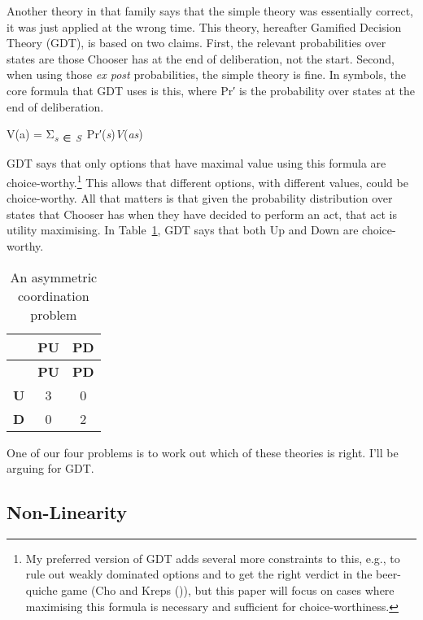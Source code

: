 \documentclass[
  10pt,
  letterpaper,
  DIV=11,
  numbers=noendperiod,
  twoside]{scrartcl}
\providecommand{\tightlist}{%
  \setlength{\itemsep}{0pt}\setlength{\parskip}{0pt}}\usepackage{longtable,booktabs,array}
\begin{document}
Another theory in that family says that the simple theory was
essentially correct, it was just applied at the wrong time. This theory,
hereafter Gamified Decision Theory (GDT), is based on two claims. First,
the relevant probabilities over states are those Chooser has at the end
of deliberation, not the start. Second, when using those \emph{ex post}
probabilities, the simple theory is fine. In symbols, the core formula
that GDT uses is this, where Pr′ is the probability over states at the
end of deliberation.

\begin{description}
\tightlist
\item[GDT]
V(a) =
Σ\textsubscript{\emph{s}~∈~\emph{S}}~Pr′(\emph{s})\emph{V}(\emph{as})
\end{description}

GDT says that only options that have maximal value using this formula
are choice-worthy.\footnote{My preferred version of GDT adds several
  more constraints to this, e.g., to rule out weakly dominated options
  and to get the right verdict in the beer-quiche game (Cho and Kreps
  ()), but this paper will focus on
  cases where maximising this formula is necessary and sufficient for
  choice-worthiness.} This allows that different options, with different
values, could be choice-worthy. All that matters is that given the
probability distribution over states that Chooser has when they have
decided to perform an act, that act is utility maximising. In
Table~\ref{tbl-first-coord}, GDT says that both Up and Down are
choice-worthy.

\begin{longtable}[]{@{}ccc@{}}
\caption{An asymmetric coordination
problem}\label{tbl-first-coord}\tabularnewline
\toprule\noalign{}
& \textbf{PU} & \textbf{PD} \\
\midrule\noalign{}
\endfirsthead
\toprule\noalign{}
& \textbf{PU} & \textbf{PD} \\
\midrule\noalign{}
\endhead
\bottomrule\noalign{}
\endlastfoot
\textbf{U} & 3 & 0 \\
\textbf{D} & 0 & 2 \\
\end{longtable}

One of our four problems is to work out which of these theories is
right. I'll be arguing for GDT.

\subsection{Non-Linearity}\label{sec-intro-ordering}
\end{document}
